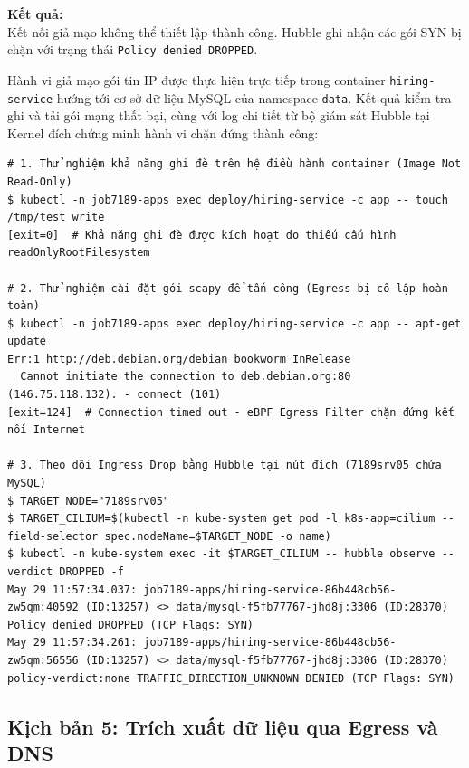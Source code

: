 \textbf{Kết quả:}\\
Kết nối giả mạo không thể thiết lập thành công. Hubble ghi nhận các gói SYN bị chặn với trạng thái \texttt{Policy denied DROPPED}.


Hành vi giả mạo gói tin IP được thực hiện trực tiếp trong container \texttt{hiring-service} hướng tới cơ sở dữ liệu MySQL của namespace \texttt{data}. Kết quả kiểm tra ghi và tải gói mạng thất bại, cùng với log chi tiết từ bộ giám sát Hubble tại Kernel đích chứng minh hành vi chặn đứng thành công:

\begin{listing}[H]
\begin{verbatim}
# 1. Thử nghiệm khả năng ghi đè trên hệ điều hành container (Image Not Read-Only)
$ kubectl -n job7189-apps exec deploy/hiring-service -c app -- touch /tmp/test_write
[exit=0]  # Khả năng ghi đè được kích hoạt do thiếu cấu hình readOnlyRootFilesystem

# 2. Thử nghiệm cài đặt gói scapy để tấn công (Egress bị cô lập hoàn toàn)
$ kubectl -n job7189-apps exec deploy/hiring-service -c app -- apt-get update
Err:1 http://deb.debian.org/debian bookworm InRelease
  Cannot initiate the connection to deb.debian.org:80 (146.75.118.132). - connect (101)
[exit=124]  # Connection timed out - eBPF Egress Filter chặn đứng kết nối Internet

# 3. Theo dõi Ingress Drop bằng Hubble tại nút đích (7189srv05 chứa MySQL)
$ TARGET_NODE="7189srv05"
$ TARGET_CILIUM=$(kubectl -n kube-system get pod -l k8s-app=cilium --field-selector spec.nodeName=$TARGET_NODE -o name)
$ kubectl -n kube-system exec -it $TARGET_CILIUM -- hubble observe --verdict DROPPED -f
May 29 11:57:34.037: job7189-apps/hiring-service-86b448cb56-zw5qm:40592 (ID:13257) <> data/mysql-f5fb77767-jhd8j:3306 (ID:28370) Policy denied DROPPED (TCP Flags: SYN)
May 29 11:57:34.261: job7189-apps/hiring-service-86b448cb56-zw5qm:56556 (ID:13257) <> data/mysql-f5fb77767-jhd8j:3306 (ID:28370) policy-verdict:none TRAFFIC_DIRECTION_UNKNOWN DENIED (TCP Flags: SYN)
\end{verbatim}
\caption{Kiểm tra tính writable, cài đặt thất bại và Log của Hubble ghi nhận sự kiện DROP}
\label{lst:kb4_hubble_cmd}
\end{listing}


\subsection{Kịch bản 5: Trích xuất dữ liệu qua Egress và DNS}
\label{subsec:kb5_dns_tunneling}

